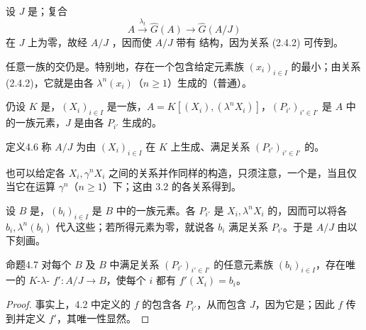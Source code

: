 设 $J$ 是；复合
\[
A\xrightarrow{\lambda_t}\widehat G(A)\longrightarrow\widehat G(A/J)
\]
在 $J$ 上为零，故经 $A/J$ ，因而使 $A/J$ 带有
结构，因为关系 (2.4.2) 可传到。

任意一族的交仍是。特别地，存在一个包含给定元素族 $(x_i)_{i\in I}$ 的最小；由关系 (2.4.2)，它就是由各 $\lambda^n(x_i)$（$n\geqslant1$）生成的（普通）。

仍设 $K$ 是，$(X_i)_{i\in I}$ 是一族，$A=K[(X_i),(\lambda^nX_i)]$，$(P_{i'})_{i'\in I'}$ 是 $A$ 中的一族元素，$J$ 是由各 $P_{i'}$ 生成的。
\begin{SGAresult}{定义}{4.6}
称 $A/J$ 为由 $(X_i)_{i\in I}$ 在 $K$ 上生成、满足关系 $(P_{i'})_{i'\in I'}$ 的。
\end{SGAresult}

也可以给定各 $X_i,\gamma^nX_i$ 之间的关系并作同样的构造，只须注意，一个是，当且仅当它在运算 $\gamma^n$（$n\geqslant1$）下；这由 3.2 的各关系得到。

设 $B$ 是，$(b_i)_{i\in I}$ 是 $B$ 中的一族元素。各 $P_{i'}$ 是 $X_i,\lambda^nX_i$ 的，因而可以将各 $b_i,\lambda^n(b_i)$ 代入这些；若所得元素为零，就说各 $b_i$ 满足关系 $P_{i'}$。于是 $A/J$ 由以下刻画。
\begin{SGAresult}{命题}{4.7}
对每个 $B$ 及 $B$ 中满足关系 $(P_{i'})_{i'\in I'}$ 的任意元素族 $(b_i)_{i\in I}$，存在唯一的 $K$-$\lambda$- $f':A/J\longrightarrow B$，使每个 $i$ 都有 $f'(X_i)=b_i$。
\end{SGAresult}
\begin{proof}
事实上，4.2 中定义的 $f$ 的包含各 $P_{i'}$，从而包含 $J$，因为它是；因此 $f$ 传到并定义
$f'$，其唯一性显然。
\end{proof}

